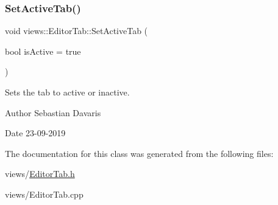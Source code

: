 \subsubsection{\texorpdfstring{Set\+Active\+Tab()}{SetActiveTab()}}
{\footnotesize\ttfamily void views\+::\+Editor\+Tab\+::\+Set\+Active\+Tab (\begin{DoxyParamCaption}\item[{bool}]{is\+Active = {\ttfamily true} }\end{DoxyParamCaption})}

Sets the tab to active or inactive. \begin{DoxyAuthor}{Author}
Sebastian Davaris 
\end{DoxyAuthor}
\begin{DoxyDate}{Date}
23-\/09-\/2019 
\end{DoxyDate}


The documentation for this class was generated from the following files\+:\begin{DoxyCompactItemize}
\item 
views/\hyperlink{_editor_tab_8h}{Editor\+Tab.\+h}\item 
views/Editor\+Tab.\+cpp\end{DoxyCompactItemize}
